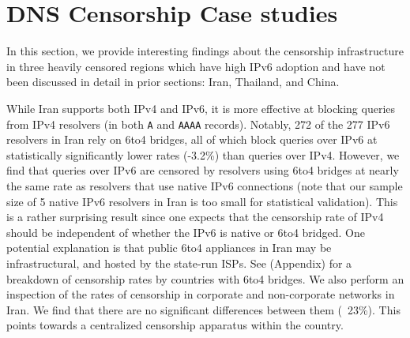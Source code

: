 \section{DNS Censorship Case studies}
\label{sec:v4vsv6-cases}
In this section, we provide interesting findings about the censorship
infrastructure in three heavily censored regions which have high IPv6 adoption
and have not been discussed in detail in prior sections: Iran, Thailand, and
China.

% 

While Iran supports both IPv4 and IPv6, it is more effective at blocking queries
from IPv4 resolvers (in both \texttt{A} and \texttt{AAAA} records). Notably, 272
of the 277 IPv6 resolvers in Iran rely on 6to4 bridges, all of which block
queries over IPv6 at statistically significantly lower rates (-3.2\%) than
queries over IPv4. 
%
However, we find that queries over IPv6 are censored by resolvers using 6to4
bridges at nearly the same rate as resolvers that use native IPv6 connections
(note that our sample size of 5 native IPv6 resolvers in Iran is too small for
statistical validation). This is a rather surprising result since one expects
that the censorship rate of IPv4 should be independent of whether the IPv6 is
native or 6to4 bridged. One potential explanation is that public 6to4
appliances in Iran may be infrastructural, and hosted by the state-run ISPs.
See  (Appendix) for a breakdown of
censorship rates by countries with 6to4 bridges.
%
We also perform an inspection of the rates of censorship in corporate and
non-corporate networks in Iran. We find that there are no significant
differences between them (~23\%). This points towards a centralized censorship
apparatus within the country.

